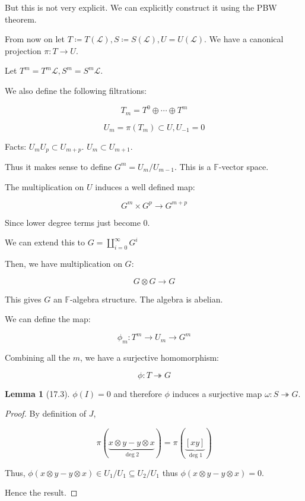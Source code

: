 \documentclass{article}
\theoremstyle{definition}
\newtheorem{lemma}[theorem]{Lemma}
\begin{document}
    But this is not very explicit. We can explicitly construct it using the PBW theorem.

    From now on let \(T\coloneqq T(\mathcal{L}), S \coloneqq S(\mathcal{L}), U = U(\mathcal{L})\). We have a canonical projection \(\pi: T \to U\).
    
    Let \(T^m = T^m \mathcal{L}, S^m = S^m \mathcal{L}\).

    We also define the following filtrations:

    \[
        T_m = T^0 \oplus \cdots \oplus T^m
    \]

    \[
        U_m = \pi(T_m) \subset U, U_{-1} = 0
    \]

    Facts: \(U_m U_p \subset U_{m+p}\). \(U_m \subset U_{m+1}\).
    
    Thus it makes sense to define \(G^m = U_m / U_{m-1}\). This is a \(\mathbb{F}\)-vector space.

    The multiplication on \(U\) induces a well defined map:

    \[
        G^m \times G^p \to G^{m+p}
    \]

    Since lower degree terms just become \(0\).

    We can extend this to \(G = \coprod_{i=0}^{\infty}G^i\)

    Then, we have multiplication on \(G\):

    \[
        G \otimes G \to G
    \]

    This gives \(G\) an \(\mathbb{F}\)-algebra structure. The algebra is abelian.

    We can define the map:

    \[
        \phi_m : T^m \to U_m \to G^m
    \]

    Combining all the \(m\), we have a surjective homomorphism:

    \[
        \phi: T \twoheadrightarrow G
    \]

    \begin{lemma}
        [17.3]

        \(\phi(I) = 0\) and therefore \(\phi\) induces a surjective map \(\omega: S \twoheadrightarrow G\).
    \end{lemma}

    \begin{proof}
        By definition of \(J\),

        \[
            \pi (\underbrace{x \otimes y - y \otimes x}_{\deg 2}) = \pi(\underbrace{[xy]}_{\deg 1})
        \]

        Thus, \(\phi(x \otimes y - y \otimes x) \in U_1 / U_1 \subseteq U_2 / U_1\) thus \(\phi(x \otimes y - y \otimes x) = 0\).

        Hence the result.
    \end{proof}
\end{document}
